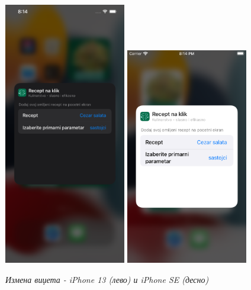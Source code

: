 \documentclass[12pt,oneside]{memoir}
\begin{document}
\begin{figure} [H]
    \centering
    \captionsetup{justification=centering}
    \includegraphics[width=0.475\textwidth]{images/simulators/view images/dark - change widget.png}
    \hfill
    \includegraphics[width=0.475\textwidth]{images/simulators/view images/light - change widget.png} 
    \caption{\textit{Измена виџета - iPhone 13 (лево) и iPhone SE (десно)}}
    \label{slika:измена_виџета_1}
\end{figure}
\end{document}
